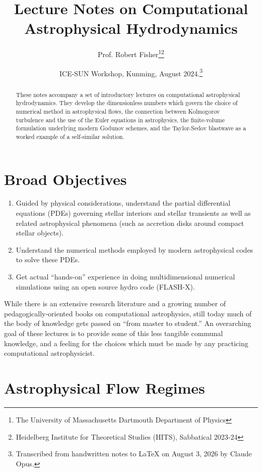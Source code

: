 \documentclass[notoc]{tufte-handout}
\title{Lecture Notes on Computational Astrophysical Hydrodynamics}
\author[Prof. Robert Fisher]{Prof. Robert Fisher\thanks{The University of Massachusetts Dartmouth Department of Physics}\thanks{Heidelberg Institute for Theoretical Studies (HITS), Sabbatical 2023-24}}
\date{ICE-SUN Workshop, Kunming, August 2024.\thanks{Transcribed from handwritten notes to \LaTeX{} on August 3, 2026 by Claude Opus.}}
\begin{document}
\maketitle

\begin{abstract}
These notes accompany a set of introductory lectures on computational astrophysical hydrodynamics. They develop the dimensionless numbers which govern the choice of numerical method in astrophysical flows, the connection between Kolmogorov turbulence and the use of the Euler equations in astrophysics, the finite-volume formulation underlying modern Godunov schemes, and the Taylor-Sedov blastwave as a worked example of a self-similar solution.
\end{abstract}

\newpage

\setcounter{tocdepth}{2}
\tableofcontents

\newpage


\section{Broad Objectives}

\begin{enumerate}
    \item Guided by physical considerations, understand the partial differential equations (PDEs) governing stellar interiors and stellar transients as well as related astrophysical phenomena (such as accretion disks around compact stellar objects).

    \item Understand the numerical methods employed by modern astrophysical codes to solve these PDEs.

    \item Get actual ``hands-on'' experience in doing multidimensional numerical simulations using an open source hydro code (FLASH-X).
\end{enumerate}

While there is an extensive research literature and a growing number of pedagogically-oriented books on computational astrophysics, still today much of the body of knowledge gets passed on ``from master to student.'' An overarching goal of these lectures is to provide some of this less tangible communal knowledge, and a feeling for the choices which must be made by any practicing computational astrophysicist.


\section{Astrophysical Flow Regimes}
\end{document}
